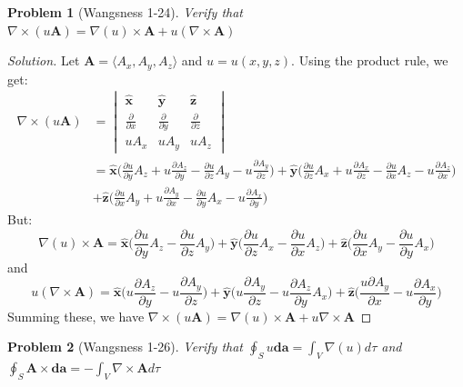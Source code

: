\documentclass[oneside]{book}
\theoremstyle{mystyle}
\newtheorem{problem}{Problem}[section]
\begin{document}
\begin{problem}[Wangsness 1-24]
Verify that $\nabla \times (u\mathbf{A}) = \nabla(u)\times \mathbf{A}+u(\nabla \times \mathbf{A})$
\end{problem}
\begin{proof}[Solution]
Let $\mathbf{A} = \langle A_x,A_y,A_z\rangle$ and $u = u(x,y,z)$. Using the product rule, we get:
\begin{align*}
    \nabla \times (u\mathbf{A}) &= \begin{vmatrix} \hat{\mathbf{x}} & \hat{\mathbf{y}} & \hat{\mathbf{z}} \\ \frac{\partial}{\partial x} & \frac{\partial}{\partial y} & \frac{\partial}{\partial z} \\ uA_x & uA_y & uA_z \end{vmatrix}\\
    &= \hat{\mathbf{x}}\big( \frac{\partial u}{\partial y} A_z + u \frac{\partial A_z}{\partial y}-\frac{\partial u}{\partial z}A_y -u \frac{\partial A_y}{\partial z}\big) + \hat{\mathbf{y}}\big(\frac{\partial u}{\partial z} A_x + u \frac{\partial A_x}{\partial z} - \frac{\partial u}{\partial x} A_z - u\frac{\partial A_z}{\partial x}\big)\\ &+ \hat{\mathbf{z}}\big(\frac{\partial u}{\partial x}A_y + u \frac{\partial A_y}{\partial x} - \frac{\partial u}{\partial y}A_x - u\frac{\partial A_x}{\partial y}\big)   
\end{align*}
%
But:
\begin{equation*}
    \nabla(u)\times \mathbf{A} = \hat{\mathbf{x}}\big(\frac{\partial u}{\partial y}A_z - \frac{\partial u}{\partial z}A_y\big) + \hat{\mathbf{y}}\big(\frac{\partial u}{\partial z}A_x - \frac{\partial u}{\partial x}A_z\big) + \hat{\mathbf{z}}\big(\frac{\partial u}{\partial x}A_y - \frac{\partial u}{\partial y}A_x\big)
\end{equation*}
%
and
%
\begin{equation*}
    u(\nabla \times \mathbf{A}) = \hat{\mathbf{x}}\big(u\frac{\partial A_z}{\partial y} - u\frac{\partial A_y}{\partial z}\big) + \hat{\mathbf{y}}\big(u\frac{\partial A_y}{\partial z} -u\frac{\partial A_z}{\partial y}A_x\big) + \hat{\mathbf{z}}\big(\frac{u\partial A_y}{\partial x}-u\frac{\partial A_x}{\partial y}\big)   
\end{equation*}
%
Summing these, we have $\nabla \times (u\mathbf{A}) =\nabla(u)\times \mathbf{A}+u\nabla \times \mathbf{A}$
\end{proof}
%
\begin{problem}[Wangsness 1-26]
Verify that $\oint_{S} u\boldsymbol{da}= \int_{V} \nabla(u)d\tau$ and $\oint_{S} \mathbf{A}\times \boldsymbol{da}= -\int_{V} \nabla \times \mathbf{A} d\tau$
\end{problem}
\end{document}
